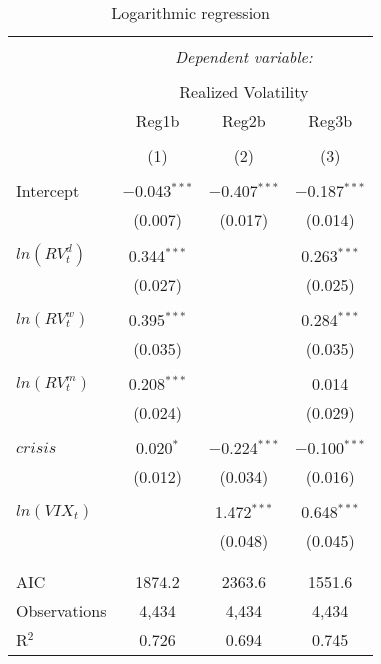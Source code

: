 
\begin{table}[!htbp] \centering 
\begin{threeparttable}
  \caption{Logarithmic regression} 
  \label{tab:newey2} 
\begin{tabular}{@{\extracolsep{5pt}}lccc} 
\\[-1.8ex]\hline 
\hline \\[-1.8ex] 
 & \multicolumn{3}{c}{\textit{Dependent variable:}} \\ 
\cline{2-4} 
\\[-1.8ex] & \multicolumn{3}{c}{Realized Volatility} \\ 
 & Reg1b & Reg2b & Reg3b \\ 
\\[-1.8ex] & (1) & (2) & (3)\\ 
\hline \\[-1.8ex] 
 Intercept & $-$0.043$^{***}$ & $-$0.407$^{***}$ & $-$0.187$^{***}$ \\ 
  & (0.007) & (0.017) & (0.014) \\ 
  & & & \\ 
 $ln(RV^{d}_{t})$ & 0.344$^{***}$ &  & 0.263$^{***}$ \\ 
  & (0.027) &  & (0.025) \\ 
  & & & \\ 
 $ln(RV^{w}_{t})$ & 0.395$^{***}$ &  & 0.284$^{***}$ \\ 
  & (0.035) &  & (0.035) \\ 
  & & & \\ 
 $ ln(RV^{m}_{t})$ & 0.208$^{***}$ &  & 0.014 \\ 
  & (0.024) &  & (0.029) \\ 
  & & & \\ 
 $crisis$ & 0.020$^{*}$ & $-$0.224$^{***}$ & $-$0.100$^{***}$ \\ 
  & (0.012) & (0.034) & (0.016) \\ 
  & & & \\ 
 $ln(VIX_{t})$ &  & 1.472$^{***}$ & 0.648$^{***}$ \\ 
  &  & (0.048) & (0.045) \\ 
  & & & \\ 
\hline \\[-1.8ex] 
AIC & 1874.2 & 2363.6 & 1551.6 \\ 
Observations & 4,434 & 4,434 & 4,434 \\ 
R$^{2}$ & 0.726 & 0.694 & 0.745 \\ 

\end{tabular}
\end{threeparttable}
\end{table}
